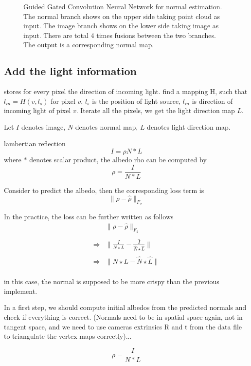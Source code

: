\begin{figure}[th]
\begin{tikzpicture}
	\end{tikzpicture}
	
	\caption{Guided Gated Convolution Neural Network for normal estimation. The normal branch shows on the upper side taking point cloud as input. The image branch shows on the lower side taking image as input. There are total 4 times fusions between the two branches. The output is a corresponding normal map.}
	\label{fig:ng-archi}
\end{figure}

\subsection{Add the light information}

stores for every pixel the direction of incoming light.
find a mapping H, such that $ l_{in} = H(v, l_{s}) $ for pixel $ v $, $ l_s $ is the position of light source, $ l_{in} $ is direction of incoming light of pixel $ v $. Iterate all the pixels, we get the light direction map $ L $.

Let $ I $ denotes image, $ N $ denotes normal map, $ L $ denotes light direction map.

lambertian reflection
\[I = \rho N*L\]
where $ * $ denotes scalar product,
the albedo rho can be computed by 
\[\rho = \frac{I}{N*L}\]

Consider to predict the albedo, then the corresponding loss term is 
\[\|\rho-\hat\rho \|_{F_2}\]

In the practice, the loss can be further written as follows
\begin{equation}
	\begin{array}{cc}
		&\|\rho-\hat\rho \|_{F_2}\\
		\\
		\Rightarrow &  \| \frac{I}{N\star L} - \frac{\hat I}{\hat N \star \hat L} \|\\
		\\
		\Rightarrow &  \| N\star L - \hat N \star \hat L \|\\
	\end{array}
\end{equation}

in this case, the normal is supposed to be more crispy than the previous implement.

In a first step, we should compute initial albedos from the predicted
normals and check if everything is correct. (Normals need to be in
spatial space again, not in tangent space, and we need to use cameras
extrinsics R and t from the data file to triangulate the vertex maps
correctly)...

\[\rho = \frac{I}{N*L}\]





